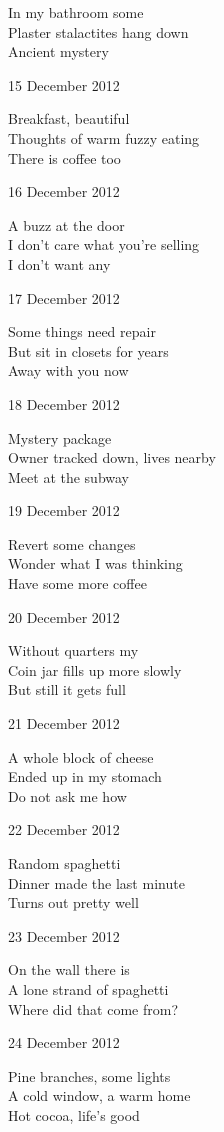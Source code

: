 \documentclass[12pt]{article}
\begin{document}
In my bathroom some \\
Plaster stalactites hang down \\
Ancient mystery

15 December 2012

Breakfast, beautiful \\
Thoughts of warm fuzzy eating \\
There is coffee too

16 December 2012
 
A buzz at the door \\
I don't care what you're selling \\
I don't want any

17 December 2012

Some things need repair \\
But sit in closets for years \\
Away with you now

\newpage

18 December 2012

Mystery package \\
Owner tracked down, lives nearby \\
Meet at the subway

19 December 2012

Revert some changes \\
Wonder what I was thinking \\
Have some more coffee

20 December 2012

Without quarters my \\
Coin jar fills up more slowly \\
But still it gets full

21 December 2012

A whole block of cheese \\
Ended up in my stomach \\
Do not ask me how 

22 December 2012

Random spaghetti \\
Dinner made the last minute \\
Turns out pretty well

23 December 2012

On the wall there is \\
A lone strand of spaghetti \\
Where did that come from?

24 December 2012

Pine branches, some lights \\
A cold window, a warm home \\
Hot cocoa, life's good
\end{document}
